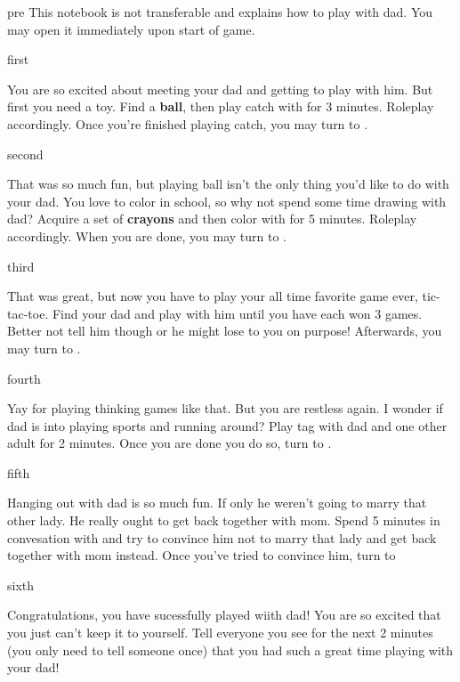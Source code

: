 \documentclass[notebook]{guildcamp1}
\begin{document}
\startnotebook{\nPlayWithDad{}}

\begin{page}{pre}
This notebook is not transferable and explains how to play with dad. You may open it immediately upon start of game.
\end{page}

\begin{page}{first}

You are so excited about meeting your dad and getting to play with him. But first you need a toy. Find a {\bf ball}, then play catch with \cGroom{} for 3 minutes. Roleplay accordingly.  Once you're finished playing catch, you may turn to .

\end{page}

\begin{page}{second}

That was so much fun, but playing ball isn't the only thing you'd like to do with your dad.  You love to color in school, so why not spend some time drawing with dad?  Acquire a set of {\bf crayons} and then color with \cGroom{} for 5 minutes. Roleplay accordingly. When you are done, you may turn to .

\end{page}

\begin{page}{third}

That was great, but now you have to play your all time favorite game ever, tic-tac-toe.  Find your dad and play with him until you have  each won 3 games.  Better not tell him though or he might lose to you on purpose! Afterwards, you may turn to .

\end{page}

\begin{page}{fourth}

Yay for playing thinking games like that. But you are restless again. I wonder if dad is into playing sports and running around? Play tag with dad and one other adult for 2 minutes. Once you are done you do so, turn to .

\end{page}

\begin{page}{fifth}

Hanging out with dad is so much fun. If only he weren't going to marry that other lady. He really ought to get back together with mom. Spend 5 minutes in convesation with \cGroom{} and try to convince him not to marry that lady and get back together with mom instead. Once you've tried to convince him, turn to 

\end{page}

\begin{page}{sixth}

Congratulations, you have sucessfully played wiith dad! You are so excited that you just can't keep it to yourself. Tell everyone you see for the next 2 minutes (you only need to tell someone once) that you had such a great time playing with your dad!

\end{page}

\endnotebook
\end{document}
